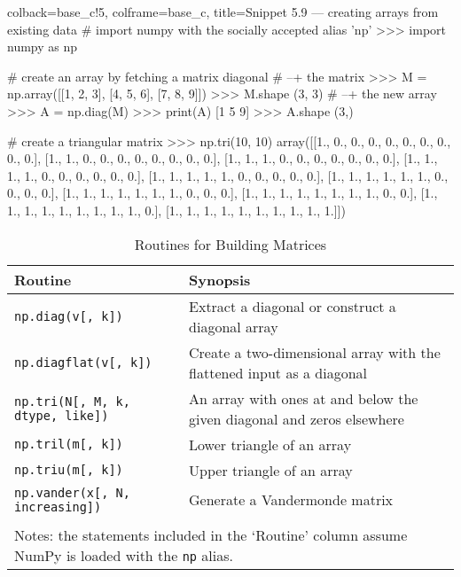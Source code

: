 \documentclass[a4paper,11pt]{book}
\numberwithin{figure}{chapter}
\numberwithin{table}{chapter}
\begin{document}
\begin{pythoncode}[linenos=true,]{colback=base_c!5, colframe=base_c, title=\sffamily Snippet 5.9 --- creating arrays from existing data}
# import numpy with the socially accepted alias 'np'
>>> import numpy as np

# create an array by fetching a matrix diagonal 
# --+ the matrix 
>>> M = np.array([[1, 2, 3], [4, 5, 6], [7, 8, 9]])
>>> M.shape
(3, 3)
# --+ the new array 
>>> A = np.diag(M)
>>> print(A)
[1 5 9]
>>> A.shape
(3,)

# create a triangular matrix
>>> np.tri(10, 10)
array([[1., 0., 0., 0., 0., 0., 0., 0., 0., 0.],
       [1., 1., 0., 0., 0., 0., 0., 0., 0., 0.],
       [1., 1., 1., 0., 0., 0., 0., 0., 0., 0.],
       [1., 1., 1., 1., 0., 0., 0., 0., 0., 0.],
       [1., 1., 1., 1., 1., 0., 0., 0., 0., 0.],
       [1., 1., 1., 1., 1., 1., 0., 0., 0., 0.],
       [1., 1., 1., 1., 1., 1., 1., 0., 0., 0.],
       [1., 1., 1., 1., 1., 1., 1., 1., 0., 0.],
       [1., 1., 1., 1., 1., 1., 1., 1., 1., 0.],
       [1., 1., 1., 1., 1., 1., 1., 1., 1., 1.]])
\end{pythoncode}

\begin{sidewaystable}[!htbp]
	\centering
	\caption{Routines for Building Matrices}
	\label{tab:array_for_building_matrices}
	\begin{tabular}{lp{12cm}}
		\toprule \toprule
			Routine & Synopsis \\
			\midrule
			\texttt{np.diag(v[, k])}
			&Extract a diagonal or construct a diagonal array \\
			\texttt{np.diagflat(v[, k])}
			&Create a two-dimensional array with the flattened input as a diagonal\\
		        \texttt{np.tri(N[, M, k, dtype, like])}
			&An array with ones at and below the given diagonal and zeros elsewhere\\
			\texttt{np.tril(m[, k])}
			&Lower triangle of an array\\
			\texttt{np.triu(m[, k])}
			&Upper triangle of an array\\
			\texttt{np.vander(x[, N, increasing])}
			&Generate a Vandermonde matrix\\
			\bottomrule \\[-1.8ex]
			\multicolumn{2}{l}{Notes: the statements included in the `Routine' column assume NumPy is loaded with the \texttt{np} alias.} \\
	\end{tabular}
\end{sidewaystable}
\clearpage
\end{document}
